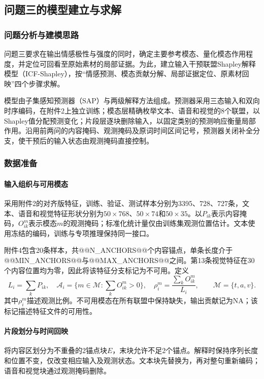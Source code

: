 \subsection{问题三的模型建立与求解}
\label{sec:q3}
\subsubsection{问题分析与建模思路}
问题三要求在输出情感极性与强度的同时，确定主要参考模态、量化模态作用程度，并定位可回看至原始素材的局部证据。为此，建立输入干预联盟Shapley解释模型（ICF-Shapley），按“情感预测、模态贡献分解、局部证据定位、原素材回映”四个步骤求解。

模型由子集感知预测器（SAP）与两级解释方法组成。预测器采用三态输入和双向时序编码，在附件2上独立训练；模态层精确枚举文本、语音和视觉的8个联盟，以Shapley值分配预测变化；片段层逐块删除输入，以固定类别的预测响应衡量局部作用。沿用前两问的内容掩码、观测掩码及原词时间区间记号，预测器关闭补全分支，使干预后的输入状态由观测掩码直接控制。

\subsubsection{数据准备}
\paragraph{输入组织与可用模态}
采用附件2的对齐版特征，训练、验证、测试样本分别为3395、728、727条，文本、语音和视觉特征形状分别为$50\times768$、$50\times74$和$50\times35$。以$P_{ik}$表示内容掩码，$O^m_{ik}$表示模态$m$的观测掩码；标准化统计量仅由训练集观测位置估计。文本使用冻结的编码，训练与专项推理保持同一接口。

附件4包含20条样本，共@@N_ANCHORS@@个内容锚点，单条长度介于@@MIN_ANCHORS@@与@@MAX_ANCHORS@@之间。第13条视觉特征在30个内容位置均为零，因此将该特征分支标记为不可用。定义
\begin{equation}
L_i=\sum_kP_{ik},\quad \mathcal A_i=\{m\in\mathcal M:\sum_kO^m_{ik}>0\},\quad
\rho_i^m=\frac{\sum_kO^m_{ik}}{L_i},\qquad\mathcal M=\{t,a,v\}.
\end{equation}
其中$\rho_i^m$描述观测比例。不可用模态在所有联盟中保持缺失，输出贡献记为NA；该标记描述特征文件的可用性。

\paragraph{片段划分与时间回映}
将内容区划分为不重叠的2锚点块$E$，末块允许不足2个锚点。解释时保持序列长度和位置不变，仅改变相应输入及观测状态。文本块先替换为\file{[UNK]}，再对整句重新编码；语音和视觉块通过观测掩码删除。

